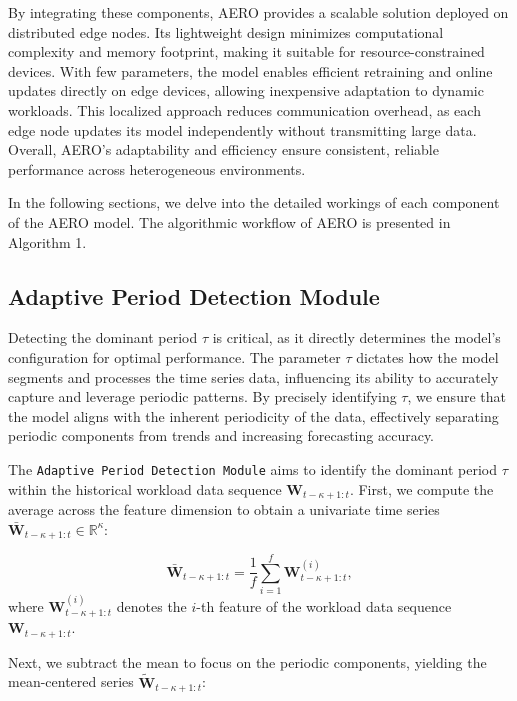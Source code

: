 \documentclass{ieeetmlcn}
\begin{document}
{\color{blue}
By integrating these components, AERO provides a scalable solution deployed on distributed edge nodes. Its lightweight design minimizes computational complexity and memory footprint, making it suitable for resource-constrained devices. With few parameters, the model enables efficient retraining and online updates directly on edge devices, allowing inexpensive adaptation to dynamic workloads. This localized approach reduces communication overhead, as each edge node updates its model independently without transmitting large data. Overall, AERO's adaptability and efficiency ensure consistent, reliable performance across heterogeneous environments.

In the following sections, we delve into the detailed workings of each component of the AERO model. The algorithmic workflow of AERO is presented in Algorithm 1.
}

\subsection{Adaptive Period Detection Module}
\label{sec:adaptive_period_detection}

{\color{blue}
Detecting the dominant period $\tau$ is critical, as it directly determines the model's configuration for optimal performance. The parameter $\tau$ dictates how the model segments and processes the time series data, influencing its ability to accurately capture and leverage periodic patterns. By precisely identifying $\tau$, we ensure that the model aligns with the inherent periodicity of the data, effectively separating periodic components from trends and increasing forecasting accuracy.
}

The \texttt{Adaptive Period Detection Module} aims to identify the dominant period $\tau$ within the historical workload data sequence $\mathbf{W}_{t-\kappa+1:t}$. First, we compute the average across the feature dimension to obtain a univariate time series $\bar{\mathbf{W}}_{t-\kappa+1:t} \in \mathbb{R}^\kappa$:

\begin{equation}
\label{eq:feature_avg}
\bar{\mathbf{W}}_{t-\kappa+1:t} = \frac{1}{f} \sum_{i=1}^{f} \mathbf{W}_{t-\kappa+1:t}^{(i)},
\end{equation}
where $\mathbf{W}_{t-\kappa+1:t}^{(i)}$ denotes the $i$-th feature of the workload data sequence $\mathbf{W}_{t-\kappa+1:t}$.

Next, we subtract the mean to focus on the periodic components, yielding the mean-centered series $\tilde{\mathbf{W}}_{t-\kappa+1:t}$:
\end{document}
